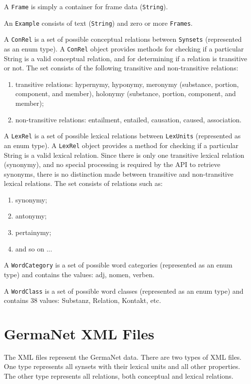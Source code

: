 \documentclass[12pt,a4paper,english,utf8]{report}
\begin{document}
A \texttt{Frame} is simply a container for frame data (\texttt{String}).

An \texttt{Example} consists of text (\texttt{String}) and zero or more \texttt{Frames}.

A \texttt{ConRel} is a set of possible conceptual relations between \texttt{Synsets} (represented as an enum type). A \texttt{ConRel} object provides methods for checking if a particular String is a valid conceptual relation, and for determining if a relation is transitive or not.  The set consists of the following transitive and non-transitive relations:

\renewcommand{\labelenumi}{•}
\begin{enumerate}
	\item transitive relations: hypernymy, hyponymy, meronymy (substance, portion, component, and member), holonymy (substance, portion, component, and member);
	\item non-transitive relations:	entailment, entailed, causation, caused, association.
\end{enumerate}

A \texttt{LexRel} is a set of possible lexical relations between \texttt{LexUnits} (represented as an enum type). A \texttt{LexRel} object provides a method for checking if a particular String is a valid lexical relation. Since there is only one transitive lexical relation (synonymy), and no special processing is required by the API to retrieve synonyms, there is no distinction made between transitive and non-transitive lexical relations. The set consists of relations such as:

\begin{enumerate}
	\item synonymy;
	\item antonymy;
	\item pertainymy;
	\item and so on ...
\end{enumerate}

A \texttt{WordCategory} is a set of possible word categories (represented as an enum type) and contains the values: adj, nomen, verben.

A \texttt{WordClass} is a set of possible word classes (represented as an enum type) and contains 38 values: Substanz, Relation, Kontakt, etc.



\section{GermaNet XML Files}
The XML files represent the GermaNet data. There are two types of XML files. One type represents all synsets with their lexical units and all other properties. The other type represents all relations, both conceptual and lexical relations.
\end{document}
